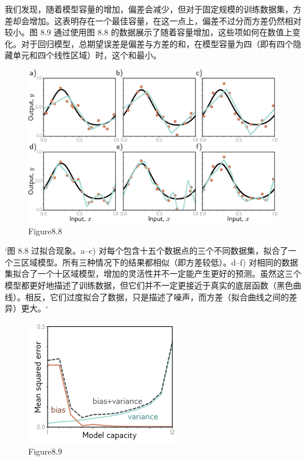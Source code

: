 我们发现，随着模型容量的增加，偏差会减少，但对于固定规模的训练数据集，方差却会增加。这表明存在一个最佳容量，在这一点上，偏差不过分而方差仍然相对较小。图 8.9 通过使用图 8.8 的数据展示了随着容量增加，这些项如何在数值上变化。对于回归模型，总期望误差是偏差与方差的和，在模型容量为四（即有四个隐藏单元和四个线性区域）时，这个和最小。

\begin{figure}[h!]
\centering
\includegraphics[width=0.7\linewidth]{png/chapter8/PerfCapacityVariance.png}
\caption{Figure8.8}
\end{figure}

`图 8.8 过拟合现象。a–c) 对每个包含十五个数据点的三个不同数据集，拟合了一个三区域模型。所有三种情况下的结果都相似（即方差较低）。d–f) 对相同的数据集拟合了一个十区域模型，增加的灵活性并不一定能产生更好的预测。虽然这三个模型都更好地描述了训练数据，但它们并不一定更接近于真实的底层函数（黑色曲线）。相反，它们过度拟合了数据，只是描述了噪声，而方差（拟合曲线之间的差异）更大。`

\begin{figure}[h!]
\centering
\includegraphics[width=0.7\linewidth]{png/chapter8/PerfBiasVarianceTradeoff.png}
\caption{Figure8.9}
\end{figure}

